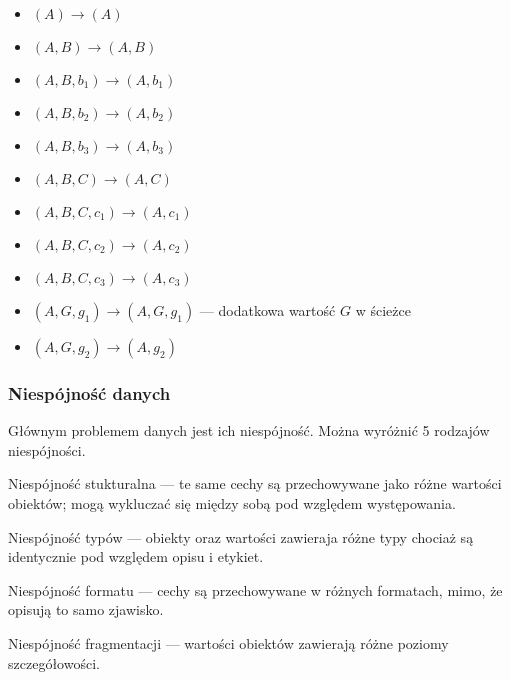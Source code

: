\begin{itemize}
\item $(A) \to (A)$
\item $(A, B) \to (A, B)$
\item $(A, B, b_1) \to (A, b_1)$
\item $(A, B, b_2) \to (A, b_2)$
\item $(A, B, b_3) \to (A, b_3)$
\item $(A, B, C) \to (A, C)$
\item $(A, B, C, c_1) \to (A, c_1)$
\item $(A, B, C, c_2) \to (A, c_2)$
\item $(A, B, C, c_3) \to (A, c_3)$
\item $(A, G, g_1) \to (A, G, g_1)$ --- 
      dodatkowa wartość $G$ w ścieżce
\item $(A, G, g_2) \to (A, g_2)$
\end{itemize}



\subsubsection{Niespójność danych}

Głównym problemem danych jest ich niespójność. Można wyróżnić
5 rodzajów niespójności.

\begin{defi}
Niespójność stukturalna --- te same cechy są przechowywane jako
różne wartości obiektów; mogą wykluczać się między sobą pod
względem występowania.
\label{def:niespójność-strukturalna}
\end{defi}

\begin{defi}
Niespójność typów --- obiekty oraz wartości zawieraja różne
typy chociaż są identycznie pod względem opisu i etykiet.
\label{def:niespójność-typu}
\end{defi}

\begin{defi}
Niespójność formatu --- cechy są przechowywane w różnych formatach,
mimo, że opisują to samo zjawisko.
\label{def:niespójność-formatu}
\end{defi}

\begin{defi}
Niespójność fragmentacji --- wartości obiektów zawierają różne
poziomy szczegółowości.
\label{def:niespójność-fragmentacji}
\end{defi}

